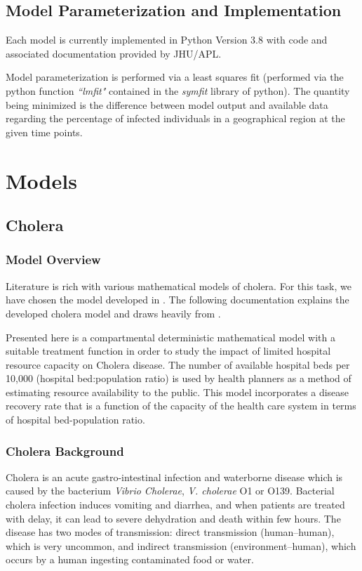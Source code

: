 \documentclass[letter,12pt, usenames,dvipsnames]{article}
\newcommand{\MYhref}[3][Blue]{\href{#2}{\color{#1}{#3}}}
\begin{document}
\subsection{Model Parameterization and Implementation}
\label{sec:Parameterization}
Each model is currently implemented in Python Version 3.8 with code and associated documentation provided by JHU/APL.

Model parameterization is performed via a least squares fit (performed via the python function \textit{``lmfit"} contained in the \textit{symfit} library of python).  The quantity being minimized is the difference between model output and available data regarding the percentage of infected individuals in a geographical region at the given time points.


\section{Models}
\subsection{Cholera}
\label{sec:cholera}
\subsubsection{Model Overview}
Literature is rich with various mathematical models of cholera.  For this task, we have chosen the model developed in {
\MYhref{https://www.ncbi.nlm.nih.gov/pmc/articles/PMC6676578/pdf/13104_2019_Article_4504.pdf}{Nyabadza et al}} \cite{cholera}.  The following documentation explains the developed cholera model and draws heavily from \cite{cholera}.

Presented here is a compartmental deterministic
mathematical model with a suitable treatment function
in order to study the impact of limited hospital resource
capacity on Cholera disease. The number of available
hospital beds per 10,000 (hospital bed:population ratio)
is used by health planners as a method of estimating
resource availability to the public. This model incorporates a disease recovery rate that is a function of the capacity of the health care system in terms of hospital bed-population ratio.

\subsubsection{Cholera Background}
 Cholera is an acute gastro-intestinal infection and waterborne disease which is caused by the bacterium \textit{Vibrio
Cholerae}, \textit{V. cholerae} O1 or O139. Bacterial cholera infection induces vomiting and diarrhea, and when patients are treated with delay, it can lead to severe dehydration and death within few hours. The disease has two modes
of transmission: direct transmission (human–human), which is very uncommon, and indirect transmission (environment–human), which occurs by a human ingesting contaminated food or water.
\end{document}
